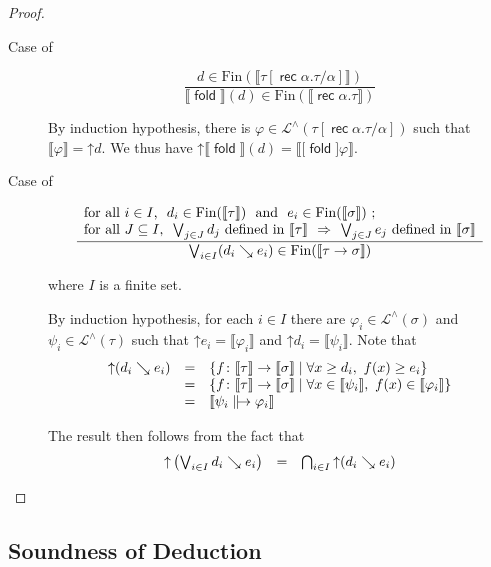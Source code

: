 \documentclass[%
  a4paper,
  UKenglish,
  cleveref,
  autoref,
  thm-restate,
  numberwithinsect,
]{lipics-v2021}
\newcommand\sle\subseteq
\newcommand\imp\Rightarrow
\newcommand\up{\mathord{\uparrow}}
\newcommand\I[1]{\llbracket #1 \rrbracket} %
\newcommand\term[1]{\mathsf{#1}}
\newcommand\type[1]{\term{#1}}
\newcommand\fold{\mathop{\term{fold}}}
\newcommand\arrow\to
\newcommand\rec{\mathop{\type{rec}}}	%
\newcommand\TV{\alpha}		%
\newcommand\defrealto{\mathrel\parallel\joinrel\to}
\newcommand\realto{\mathrel{\defrealto}}
\newcommand\PT{\tau}		%
\newcommand\PTbis{\sigma}	%
\newcommand\step{\searrow}
\newcommand\Fin{\mathrm{Fin}}	%
\newcommand\Lang{\mathcal{L}}
\newcommand\form[1]{\lbrack #1 \rbrack}
\begin{document}
\begin{proof}
\begin{description}
\item[Case of]
\[
\dfrac{d \in \Fin(\I{\PT[\rec\TV.\PT/\TV]})}
  {\I\fold(d) \in \Fin(\I{\rec\TV.\PT})}
\]

\noindent
By induction hypothesis, there is
$\varphi \in \Lang^\land(\PT[\rec\TV.\PT/\TV])$
such that $\I\varphi = \up d$.
We thus have $\up \I\fold(d) = \I{\form\fold \varphi}$.

\item[Case of]
\[
\dfrac{\begin{array}{l}
  \text{for all $i \in I$,~
  $d_i \in \Fin(\I{\PT})$
  ~and~
  $e_i \in \Fin(\I{\PTbis})$ \@;}
  \\
  \text{for all $J \sle I$,~
  $\bigvee_{j \in J} d_j$ defined in $\I{\PT}$
  ~$\imp$~
  $\bigvee_{j \in J} e_j$ defined in $\I{\PTbis}$}
  \end{array}}
  {\bigvee_{i \in I}(d_i \step e_i) \in \Fin(\I{\PT \arrow \PTbis})}
\]

\noindent
where $I$ is a finite set.

By induction hypothesis, for each $i \in I$
there are $\varphi_i \in \Lang^\land(\PTbis)$
and $\psi_i \in \Lang^\land(\PT)$
such that $\up e_i = \I{\varphi_i}$
and $\up d_i = \I{\psi_i}$.
Note that
\[
\begin{array}{l l l}
  \up(d_i \step e_i)
& =
& \left\{
  f \colon \I\PT \to \I\PTbis \mid
  \forall x \geq d_i,~
  f(x) \geq e_i
  \right\}
\\
%
& =
& \left\{
  f \colon \I\PT \to \I\PTbis \mid
  \forall x \in \I{\psi_i},~
  f(x) \in \I{\varphi_i}
  \right\}
\\
%
& =
& \I{\psi_i \realto \varphi_i}
\end{array}
\]

\noindent
The result then follows from the fact that
\[
\begin{array}{l l l}
  \up \left(
  \bigvee_{i \in I} d_i \step e_i
  \right)
& =
& \bigcap_{i \in I} \up(d_i \step e_i)
\end{array}
\]
\qedhere
\end{description}
\end{proof}



\subsection{Soundness of Deduction}
\label{sec:proof:sem:log:sound}
\end{document}
